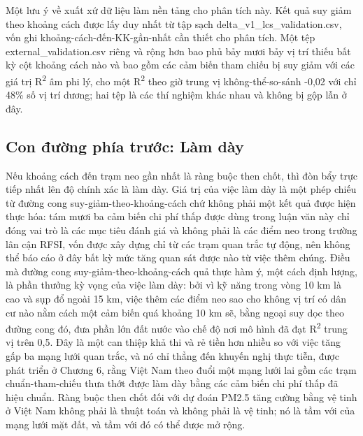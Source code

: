 Một lưu ý về xuất xứ dữ liệu làm nền tảng cho phân tích này. Kết quả suy giảm theo khoảng cách được lấy duy nhất từ tập sạch delta\_v1\_lcs\_validation.csv, vốn ghi khoảng-cách-đến-KK-gần-nhất cần thiết cho phân tích. Một tệp external\_validation.csv riêng và rộng hơn bao phủ bảy mươi bảy vị trí thiếu bất kỳ cột khoảng cách nào và bao gồm các cảm biến tham chiếu bị suy giảm với các giá trị R\textsuperscript{2} âm phi lý, cho một R\textsuperscript{2} theo giờ trung vị không-thể-so-sánh -0,02 với chỉ 48\% số vị trí dương; hai tệp là các thí nghiệm khác nhau và không bị gộp lẫn ở đây.
\subsection{Con đường phía trước: Làm dày}
Nếu khoảng cách đến trạm neo gần nhất là ràng buộc then chốt, thì đòn bẩy trực tiếp nhất lên độ chính xác là làm dày. Giá trị của việc làm dày là một phép chiếu từ đường cong suy-giảm-theo-khoảng-cách chứ không phải một kết quả được hiện thực hóa: tám mươi ba cảm biến chi phí thấp được dùng trong luận văn này chỉ đóng vai trò là các mục tiêu đánh giá và không phải là các điểm neo trong trường lân cận RFSI, vốn được xây dựng chỉ từ các trạm quan trắc tự động, nên không thể báo cáo ở đây bất kỳ mức tăng quan sát được nào từ việc thêm chúng. Điều mà đường cong suy-giảm-theo-khoảng-cách quả thực hàm ý, một cách định lượng, là phần thưởng kỳ vọng của việc làm dày: bởi vì kỹ năng trong vòng 10 km là cao và sụp đổ ngoài 15 km, việc thêm các điểm neo sao cho không vị trí có dân cư nào nằm cách một cảm biến quá khoảng 10 km sẽ, bằng ngoại suy dọc theo đường cong đó, đưa phần lớn đất nước vào chế độ nơi mô hình đã đạt R\textsuperscript{2} trung vị trên 0,5. Đây là một can thiệp khả thi và rẻ tiền hơn nhiều so với việc tăng gấp ba mạng lưới quan trắc, và nó chỉ thẳng đến khuyến nghị thực tiễn, được phát triển ở Chương 6, rằng Việt Nam theo đuổi một mạng lưới lai gồm các trạm chuẩn-tham-chiếu thưa thớt được làm dày bằng các cảm biến chi phí thấp đã hiệu chuẩn. Ràng buộc then chốt đối với dự đoán PM2.5 tăng cường bằng vệ tinh ở Việt Nam không phải là thuật toán và không phải là vệ tinh; nó là tầm với của mạng lưới mặt đất, và tầm với đó có thể được mở rộng.
